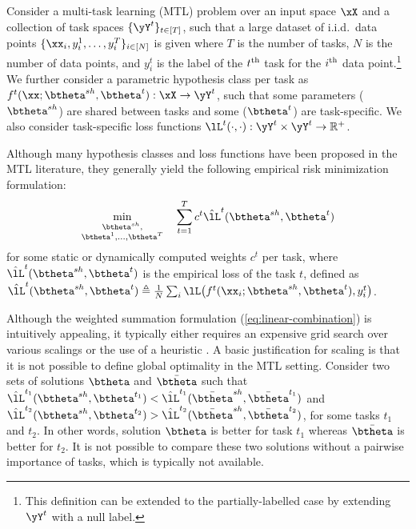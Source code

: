 
Consider a multi-task learning (MTL) problem over an input space $\xX$ and a collection of task spaces $\{\yY^t\}_{t \in [T]}$, such that a large dataset of i.i.d.\ data points $\{\xx_i, y_i^1,\ldots,y^T_i\}_{i \in [N]}$ is given where $T$ is the number of tasks, $N$ is the number of data points, and $y^t_i$ is the label of the $t^{\textup{th}}$ task for the $i^{\textup{th}}$ data point.\footnote{This definition can be extended to the partially-labelled case by extending $\yY^t$ with a null label.} We further consider a parametric hypothesis class per task as $f^t(\xx;\btheta^{sh}, \btheta^t): \xX \rightarrow \yY^t$, such that some parameters ($\btheta^{sh}$) are shared between tasks and some ($\btheta^t$) are task-specific. We also consider task-specific loss functions $\lL^t(\cdot,\cdot): \yY^t \times \yY^t \rightarrow {\Bbb R}^+$.

Although many hypothesis classes and loss functions have been proposed in the MTL literature, they generally yield the following empirical risk minimization formulation:
\begin{equation}
\min_{\substack{\btheta^{sh},\\ \btheta^1,\ldots,\btheta^T}} \quad \sum_{t=1}^T c^t \hat{\lL}^t(\btheta^{sh},\btheta^t)
\label{eq:linear-combination}
\end{equation}
for some static or dynamically computed weights $c^t$ per task, where $\hat{\lL}^t(\btheta^{sh},\btheta^t)$ is the empirical loss of the task $t$, defined as $\hat{\lL}^t(\btheta^{sh},\btheta^t) \triangleq \frac{1}{N} \sum_{i} \lL\big(f^t(\xx_i;\btheta^{sh},\btheta^t), y_i^t\big)$.

Although the weighted summation formulation (\ref{eq:linear-combination}) is intuitively appealing, it typically either requires an expensive grid search over various scalings or the use of a heuristic \citep{Kendall2018, Chen2018}. A basic justification for scaling is that it is not possible to define global optimality in the MTL setting. Consider two sets of solutions $\btheta$ and $\bar{\btheta}$ such that $\hat{\lL}^{t_1}(\btheta^{sh},\btheta^{t_1}) < \hat{\lL}^{t_1}(\bar{\btheta}^{sh},\bar{\btheta}^{t_1})$ and $\hat{\lL}^{t_2}(\btheta^{sh},\btheta^{t_2}) > \hat{\lL}^{t_2}(\bar{\btheta}^{sh},\bar{\btheta}^{t_2})$, for some tasks $t_1$ and $t_2$. In other words, solution $\btheta$ is better for task $t_1$ whereas $\bar{\btheta}$ is better for $t_2$. It is not possible to compare these two solutions without a pairwise importance of tasks, which is typically not available.

